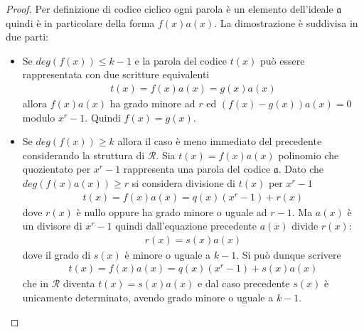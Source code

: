 \begin{proof}
   Per definizione di codice ciclico ogni parola è un elemento dell'ideale $\mathfrak{a}$ quindi è in particolare della forma $f(x)a(x)$. La dimostrazione è suddivisa in due parti:
   \begin{itemize}
      \item Se $deg(f(x)) \leq k-1$ e la parola del codice $t(x)$ può essere rappresentata con due scritture equivalenti
      \begin{align*}
         t(x) = f(x)a(x) = g(x)a(x)
      \end{align*}
      allora $f(x)a(x)$ ha grado minore ad $r$ ed $(f(x)- g(x))a(x) = 0$ modulo $x^r-1$. Quindi $f(x) = g(x)$.
      \item Se $deg(f(x)) \geq k$ allora il caso è meno immediato del precedente considerando la struttura di $\mathcal{R}$. Sia $t(x) = f(x)a(x)$ polinomio che quozientato per $x^r-1$ rappresenta una parola del codice $\mathfrak{a}$. Dato che $deg(f(x)a(x))\geq r $ si considera divisione di $t(x)$ per $x^r - 1$
      \begin{align*}
      t(x) = f(x)a(x) = q(x)(x^r - 1) + r(x)
      \end{align*}
      dove $r(x)$ è nullo oppure ha grado minore o uguale ad $r-1$. Ma $a(x)$ è un divisore di $x^r-1$ quindi dall'equazione precedente $a(x)$ divide $r(x)$:
      \begin{align*}
         r(x) = s(x)a(x)
      \end{align*}
      dove il grado di $s(x)$ è minore o uguale a $k-1$. Si può dunque scrivere
      \begin{align*}
      t(x) = f(x)a(x) = q(x)(x^r - 1) + s(x)a(x)
      \end{align*}
      che in $\mathcal{R}$ diventa $t(x) = s(x)a(x)$ e dal caso precedente $s(x)$ è unicamente determinato, avendo grado minore o uguale a $k-1$.
   \end{itemize}
\end{proof}

